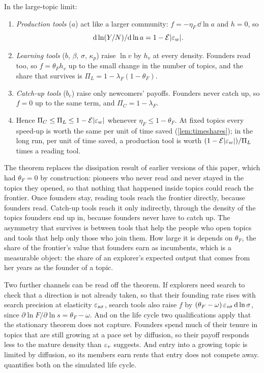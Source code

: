 \begin{corollary}\label{cor:ordering}
In the large-topic limit:
\begin{enumerate}[label=(\roman*)]
\item \emph{Production tools} ($a$) act like a larger community: $f=-\eta_F\,\dd\ln a$ and $h=0$, so
\[
\mathrm{d}\ln(Y/N)/\mathrm{d}\ln a=1-\mathcal E|\varepsilon_w| .
\]
\item \emph{Learning tools} ($b$, $\beta$, $\sigma$, $\kappa_p$) raise $\ln v$ by $h_v$ at every density. Founders read too, so $f=\theta_F h_v$ up to the small change in the number of topics, and the share that survives is $\Pi_L=1-\lambda_F(1-\theta_F)$.
\item \emph{Catch-up tools} ($b_c$) raise only newcomers' payoffs. Founders never catch up, so $f=0$ up to the same term, and $\Pi_C=1-\lambda_F$.
\item Hence $\Pi_C\le\Pi_L\le1-\mathcal E|\varepsilon_w|$ whenever $\eta_F\le1-\theta_F$. At fixed topics every speed-up is worth the same per unit of time saved (\cref{lem:timeshares}); in the long run, per unit of time saved, a production tool is worth $(1-\mathcal E|\varepsilon_w|)/\Pi_L$ times a reading tool.
\end{enumerate}
\end{corollary}

The theorem replaces the dissipation result of earlier versions of this
paper, which had $\theta_F=0$ by construction: pioneers who never read and
never stayed in the topics they opened, so that nothing that happened inside
topics could reach the frontier. Once founders stay, reading tools reach the
frontier directly, because founders read. Catch-up tools reach it only
indirectly, through the density of the topics founders end up in, because
founders never have to catch up. The asymmetry that survives is between tools
that help the people who open topics and tools that help only those who join
them. How
large it is depends on $\theta_F$, the share of the frontier's value that
founders earn as incumbents, which is a measurable object: the share of an
explorer's expected output that comes from her years as the founder of a
topic.

Two further channels can be read off the theorem. If explorers need search to
check that a direction is not already taken, so that their founding rate
rises with search precision at elasticity $\varepsilon_{s\sigma}$, search tools also
raise $f$ by $(\theta_F-\omega)\,\varepsilon_{s\sigma}\,\mathrm{d}\ln\sigma$, since
$\partial\ln F/\partial\ln s=\theta_F-\omega$. And on the life cycle two
qualifications apply that the stationary theorem does not capture. Founders
spend much of their tenure in topics that are still growing at a pace set by
diffusion, so their payoff responds less to the mature density than $\varepsilon_v$
suggests. And entry into a growing topic is limited by diffusion, so its
members earn rents that entry does not compete away. 
quantifies both on the simulated life cycle.

